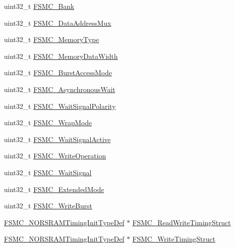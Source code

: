 \begin{DoxyCompactItemize}
\item 
uint32\-\_\-t \hyperlink{struct_f_s_m_c___n_o_r_s_r_a_m_init_type_def_a787e4c845195c81c7326893451a2fc6f}{F\-S\-M\-C\-\_\-\-Bank}
\item 
uint32\-\_\-t \hyperlink{struct_f_s_m_c___n_o_r_s_r_a_m_init_type_def_a543a5c385820244e5f3b5a96b3b79f46}{F\-S\-M\-C\-\_\-\-Data\-Address\-Mux}
\item 
uint32\-\_\-t \hyperlink{struct_f_s_m_c___n_o_r_s_r_a_m_init_type_def_ab40afbbbeb92dd80001c6dfbb1f26492}{F\-S\-M\-C\-\_\-\-Memory\-Type}
\item 
uint32\-\_\-t \hyperlink{struct_f_s_m_c___n_o_r_s_r_a_m_init_type_def_aa89fb8c812e5ef7800eef9574dcb972d}{F\-S\-M\-C\-\_\-\-Memory\-Data\-Width}
\item 
uint32\-\_\-t \hyperlink{struct_f_s_m_c___n_o_r_s_r_a_m_init_type_def_a39ac3b708e861c1137a72ed0f7ede7ae}{F\-S\-M\-C\-\_\-\-Burst\-Access\-Mode}
\item 
uint32\-\_\-t \hyperlink{struct_f_s_m_c___n_o_r_s_r_a_m_init_type_def_a9178fc2849ddd6277a0dd2655c8b600c}{F\-S\-M\-C\-\_\-\-Asynchronous\-Wait}
\item 
uint32\-\_\-t \hyperlink{struct_f_s_m_c___n_o_r_s_r_a_m_init_type_def_a1b4af656a06371a567ccf494274c1261}{F\-S\-M\-C\-\_\-\-Wait\-Signal\-Polarity}
\item 
uint32\-\_\-t \hyperlink{struct_f_s_m_c___n_o_r_s_r_a_m_init_type_def_a62dd24d87fe026df5e35dc58a00988b4}{F\-S\-M\-C\-\_\-\-Wrap\-Mode}
\item 
uint32\-\_\-t \hyperlink{struct_f_s_m_c___n_o_r_s_r_a_m_init_type_def_aef0e381a5fbf637ad892903889a63583}{F\-S\-M\-C\-\_\-\-Wait\-Signal\-Active}
\item 
uint32\-\_\-t \hyperlink{struct_f_s_m_c___n_o_r_s_r_a_m_init_type_def_a3a876d65250ab693595b9b840ad63676}{F\-S\-M\-C\-\_\-\-Write\-Operation}
\item 
uint32\-\_\-t \hyperlink{struct_f_s_m_c___n_o_r_s_r_a_m_init_type_def_af7faa84a2f52410da02302eb2f48507a}{F\-S\-M\-C\-\_\-\-Wait\-Signal}
\item 
uint32\-\_\-t \hyperlink{struct_f_s_m_c___n_o_r_s_r_a_m_init_type_def_a3726a70e62c3e7d5172296e88d36cfe4}{F\-S\-M\-C\-\_\-\-Extended\-Mode}
\item 
uint32\-\_\-t \hyperlink{struct_f_s_m_c___n_o_r_s_r_a_m_init_type_def_a9f46fdb3f72340b6584d34501c19dbd4}{F\-S\-M\-C\-\_\-\-Write\-Burst}
\item 
\hyperlink{struct_f_s_m_c___n_o_r_s_r_a_m_timing_init_type_def}{F\-S\-M\-C\-\_\-\-N\-O\-R\-S\-R\-A\-M\-Timing\-Init\-Type\-Def} $\ast$ \hyperlink{struct_f_s_m_c___n_o_r_s_r_a_m_init_type_def_a9d18e112e4c644279e211c4a92dcd9a3}{F\-S\-M\-C\-\_\-\-Read\-Write\-Timing\-Struct}
\item 
\hyperlink{struct_f_s_m_c___n_o_r_s_r_a_m_timing_init_type_def}{F\-S\-M\-C\-\_\-\-N\-O\-R\-S\-R\-A\-M\-Timing\-Init\-Type\-Def} $\ast$ \hyperlink{struct_f_s_m_c___n_o_r_s_r_a_m_init_type_def_a1fbd19341b882de69c3026234eff037a}{F\-S\-M\-C\-\_\-\-Write\-Timing\-Struct}
\end{DoxyCompactItemize}


